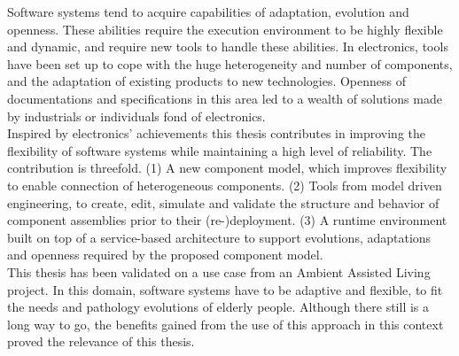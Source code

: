 Software systems tend to acquire capabilities of adaptation, evolution and openness. These abilities require the execution environment to be highly flexible and dynamic, and require new tools to handle these abilities. In electronics, tools have been set up to cope with the huge heterogeneity and number of components, and the adaptation of existing products to new technologies. Openness of documentations and specifications in this area led to a wealth of solutions made by industrials or individuals fond of electronics.\\
Inspired by electronics' achievements this thesis contributes in improving the flexibility of software systems while maintaining a high level of reliability. The contribution is threefold. (1) A new component model, which improves flexibility to enable connection of heterogeneous components. (2) Tools from model driven engineering, to create, edit, simulate and validate the structure and behavior of component assemblies prior to their (re-)deployment. (3) A runtime environment built on top of a service-based architecture to support evolutions, adaptations and openness required by the proposed component model.\\
This thesis has been validated on a use case from an Ambient Assisted Living project. In this domain, software systems have to be adaptive and flexible, to fit the needs and pathology evolutions of elderly people. Although there still is a long way to go, the benefits gained from the use of this approach in this context proved the relevance of this thesis.